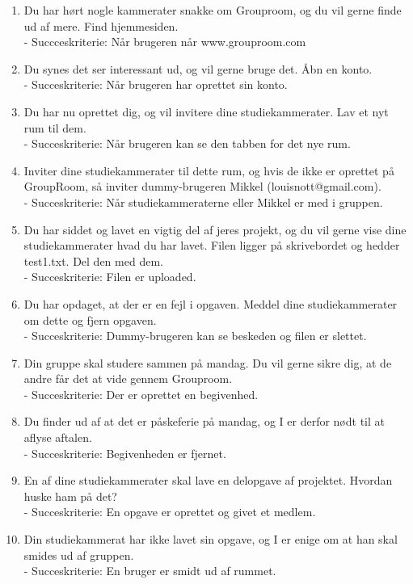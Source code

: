 \documentclass[12pt]{article}
\begin{document}
\begin{enumerate}
\item Du har hørt nogle kammerater snakke om Grouproom, og du vil gerne finde ud af mere. Find hjemmesiden.\\
- Succceskriterie: Når brugeren når www.grouproom.com
\item Du synes det ser interessant ud, og vil gerne bruge det. Åbn en konto.\\
- Succeskriterie: Når brugeren har oprettet sin konto.
\item Du har nu oprettet dig, og vil invitere dine studiekammerater. Lav et nyt rum til dem.\\
- Succeskriterie: Når brugeren kan se den tabben for det nye rum.
\item Inviter dine studiekammerater til dette rum, og hvis de ikke er oprettet på GroupRoom, så inviter dummy-brugeren Mikkel (louisnott@gmail.com).\\
- Succeskriterie: Når studiekammeraterne eller Mikkel er med i gruppen.
\item Du har siddet og lavet en vigtig del af jeres projekt, og du vil gerne vise dine studiekammerater hvad du har lavet. Filen ligger på skrivebordet og hedder test1.txt. Del den med dem.\\
- Succeskriterie: Filen er uploaded.
\item Du har opdaget, at der er en fejl i opgaven. Meddel dine studiekammerater om dette og fjern opgaven.\\
- Succeskriterie: Dummy-brugeren kan se beskeden og filen er slettet.
\item Din gruppe skal studere sammen på mandag. Du vil gerne sikre dig, at de andre får det at vide gennem Grouproom.\\
- Succeskriterie: Der er oprettet en begivenhed.
\item Du finder ud af at det er påskeferie på mandag, og I er derfor nødt til at aflyse aftalen.\\
- Succeskriterie: Begivenheden er fjernet.
\item En af dine studiekammerater skal lave en delopgave af projektet. Hvordan huske ham på det?\\
- Succeskriterie: En opgave er oprettet og givet et medlem.
\item Din studiekammerat har ikke lavet sin opgave, og I er enige om at han skal smides ud af gruppen.\\
- Succeskriterie: En bruger er smidt ud af rummet.
\end{enumerate}
\end{document}
